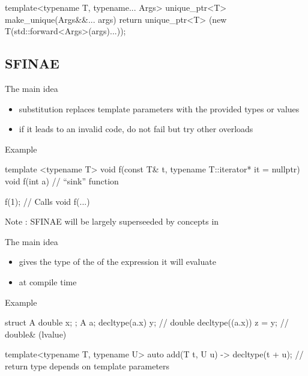 \begin{frame}[fragile]
  \begin{cppcode*}{}
    template<typename T, typename... Args>
    unique_ptr<T> make_unique(Args&&... args) {
      return unique_ptr<T>
        (new T(std::forward<Args>(args)...));
    }
  \end{cppcode*}  
\end{frame}

\subsection[snifae]{SFINAE}

\begin{frame}[fragile]
  \begin{block}{The main idea}
    \begin{itemize}
    \item substitution replaces template parameters with the provided types or values
    \item if it leads to an invalid code, do not fail but try other overloads
    \end{itemize}
  \end{block}
  \begin{exampleblock}{Example}
    \begin{cppcode*}{}
      template <typename T>
      void f(const T& t,
             typename T::iterator* it = nullptr) { }
      void f(int a) { }   // ``sink'' function

      f(1); // Calls void f(...)
    \end{cppcode*}
  \end{exampleblock}
  Note : SFINAE will be largely superseeded by concepts in 
\end{frame}

\begin{frame}[fragile]
  \begin{block}{The main idea}
    \begin{itemize}
    \item gives the type of the of the expression it will evaluate
    \item at compile time
    \end{itemize}
  \end{block}
  \begin{exampleblock}{Example}
    \begin{cppcode*}{}
      struct A { double x; };
      A a;
      decltype(a.x) y;       // double
      decltype((a.x)) z = y; // double& (lvalue)
 
      template<typename T, typename U>
      auto add(T t, U u) -> decltype(t + u);
      // return type depends on template parameters
    \end{cppcode*}
  \end{exampleblock}  
\end{frame}

